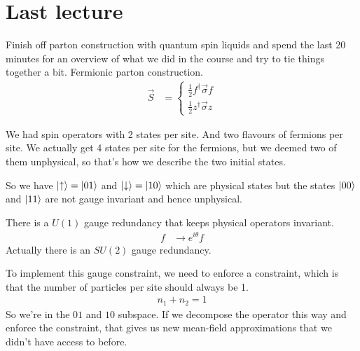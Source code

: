 \section{Last lecture}
Finish off parton construction with quantum spin liquids and spend the last 20
minutes for an overview of what we did in the course and try to tie things
together a bit.
Fermionic parton construction.
\begin{align}
    \vec{S} &=
    \begin{cases}
        \frac{1}{2}f^\dagger \vec{\sigma} f\\
        \frac{1}{2}z^\dagger \vec{\sigma} z
    \end{cases}
\end{align}

We had spin operators with 2 states per site.
And two flavours of fermions per site.
We actually get 4 states per site for the fermions,
but we deemed two of them unphysical,
so that's how we describe the two initial states.

So we have $\ket{\uparrow}=\ket{01}$
and $\ket{\downarrow}=\ket{10}$
which are physical states but the states
$\ket{00}$ and $\ket{11}$ are not gauge invariant and hence unphysical.

There is a $U(1)$ gauge redundancy that keeps physical operators invariant.
\begin{align}
    f &\to e^{i\theta}f
\end{align}
Actually there is an $SU(2)$ gauge redundancy.

To implement this gauge constraint,
we need to enforce a constraint,
which is that the number of particles per site should always be 1.
\begin{align}
    n_1 + n_2 = 1
\end{align}
So we're in the $01$ and $10$ subspace.
If we decompose the operator this way and enforce the constraint,
that gives us new mean-field approximations that we didn't have access to
before.

